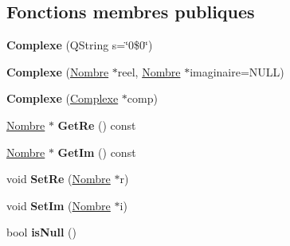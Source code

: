 \subsection*{Fonctions membres publiques}
\begin{DoxyCompactItemize}
\item 
\hypertarget{class_calcul_1_1_complexe_a339a3e1127659228bb342a3e83433927}{{\bfseries Complexe} (Q\-String s=\char`\"{}0\$0\char`\"{})}\label{class_calcul_1_1_complexe_a339a3e1127659228bb342a3e83433927}

\item 
\hypertarget{class_calcul_1_1_complexe_ad47a4a48e44aa777f6e598f8221dea42}{{\bfseries Complexe} (\hyperlink{class_calcul_1_1_nombre}{Nombre} $\ast$reel, \hyperlink{class_calcul_1_1_nombre}{Nombre} $\ast$imaginaire=N\-U\-L\-L)}\label{class_calcul_1_1_complexe_ad47a4a48e44aa777f6e598f8221dea42}

\item 
\hypertarget{class_calcul_1_1_complexe_a042ce33da08cb71e717ac3b67e6c964b}{{\bfseries Complexe} (\hyperlink{class_calcul_1_1_complexe}{Complexe} $\ast$comp)}\label{class_calcul_1_1_complexe_a042ce33da08cb71e717ac3b67e6c964b}

\item 
\hypertarget{class_calcul_1_1_complexe_acb9136f710db8d1d83a5a25d76fb6dfe}{\hyperlink{class_calcul_1_1_nombre}{Nombre} $\ast$ {\bfseries Get\-Re} () const }\label{class_calcul_1_1_complexe_acb9136f710db8d1d83a5a25d76fb6dfe}

\item 
\hypertarget{class_calcul_1_1_complexe_a07757377f6a1de6afd6364edb00784b7}{\hyperlink{class_calcul_1_1_nombre}{Nombre} $\ast$ {\bfseries Get\-Im} () const }\label{class_calcul_1_1_complexe_a07757377f6a1de6afd6364edb00784b7}

\item 
\hypertarget{class_calcul_1_1_complexe_af544268718f1709a2ff534210051442c}{void {\bfseries Set\-Re} (\hyperlink{class_calcul_1_1_nombre}{Nombre} $\ast$r)}\label{class_calcul_1_1_complexe_af544268718f1709a2ff534210051442c}

\item 
\hypertarget{class_calcul_1_1_complexe_a14ba5f590705435810d24d29e59b1012}{void {\bfseries Set\-Im} (\hyperlink{class_calcul_1_1_nombre}{Nombre} $\ast$i)}\label{class_calcul_1_1_complexe_a14ba5f590705435810d24d29e59b1012}

\item 
\hypertarget{class_calcul_1_1_complexe_a2e153caf21e98a21ccbd02ed55896056}{bool {\bfseries is\-Null} ()}\label{class_calcul_1_1_complexe_a2e153caf21e98a21ccbd02ed55896056}


\end{DoxyCompactItemize}
